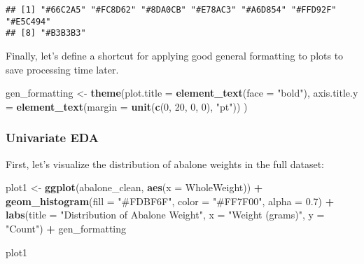 \documentclass[
]{article}
\newenvironment{Shaded}{\begin{snugshade}}{\end{snugshade}}
\newcommand{\AttributeTok}[1]{\textcolor[rgb]{0.13,0.29,0.53}{#1}}
\newcommand{\DecValTok}[1]{\textcolor[rgb]{0.00,0.00,0.81}{#1}}
\newcommand{\FloatTok}[1]{\textcolor[rgb]{0.00,0.00,0.81}{#1}}
\newcommand{\FunctionTok}[1]{\textcolor[rgb]{0.13,0.29,0.53}{\textbf{#1}}}
\newcommand{\NormalTok}[1]{#1}
\newcommand{\OtherTok}[1]{\textcolor[rgb]{0.56,0.35,0.01}{#1}}
\newcommand{\SpecialCharTok}[1]{\textcolor[rgb]{0.81,0.36,0.00}{\textbf{#1}}}
\newcommand{\StringTok}[1]{\textcolor[rgb]{0.31,0.60,0.02}{#1}}
\begin{document}
\begin{verbatim}
## [1] "#66C2A5" "#FC8D62" "#8DA0CB" "#E78AC3" "#A6D854" "#FFD92F" "#E5C494"
## [8] "#B3B3B3"
\end{verbatim}

Finally, let's define a shortcut for applying good general formatting to
plots to save processing time later.

\begin{Shaded}
\begin{Highlighting}[]
\NormalTok{gen\_formatting }\OtherTok{\textless{}{-}} \FunctionTok{theme}\NormalTok{(}\AttributeTok{plot.title =} \FunctionTok{element\_text}\NormalTok{(}\AttributeTok{face =} \StringTok{"bold"}\NormalTok{),}
                        \AttributeTok{axis.title.y =} \FunctionTok{element\_text}\NormalTok{(}\AttributeTok{margin =} \FunctionTok{unit}\NormalTok{(}\FunctionTok{c}\NormalTok{(}\DecValTok{0}\NormalTok{, }\DecValTok{20}\NormalTok{, }\DecValTok{0}\NormalTok{, }\DecValTok{0}\NormalTok{), }\StringTok{"pt"}\NormalTok{))}
\NormalTok{)}
\end{Highlighting}
\end{Shaded}

\hypertarget{univariate-eda}{%
\subsubsection{Univariate EDA}\label{univariate-eda}}

First, let's visualize the distribution of abalone weights in the full
dataset:

\begin{Shaded}
\begin{Highlighting}[]
\NormalTok{plot1 }\OtherTok{\textless{}{-}} \FunctionTok{ggplot}\NormalTok{(abalone\_clean, }\FunctionTok{aes}\NormalTok{(}\AttributeTok{x =}\NormalTok{ WholeWeight)) }\SpecialCharTok{+} 
  \FunctionTok{geom\_histogram}\NormalTok{(}\AttributeTok{fill =} \StringTok{"\#FDBF6F"}\NormalTok{, }\AttributeTok{color =} \StringTok{"\#FF7F00"}\NormalTok{, }\AttributeTok{alpha =} \FloatTok{0.7}\NormalTok{) }\SpecialCharTok{+}
  \FunctionTok{labs}\NormalTok{(}\AttributeTok{title =} \StringTok{"Distribution of Abalone Weight"}\NormalTok{,}
       \AttributeTok{x =} \StringTok{"Weight (grams)"}\NormalTok{,}
       \AttributeTok{y =} \StringTok{"Count"}\NormalTok{) }\SpecialCharTok{+}
\NormalTok{  gen\_formatting}

\NormalTok{plot1}
\end{Highlighting}
\end{Shaded}
\end{document}
